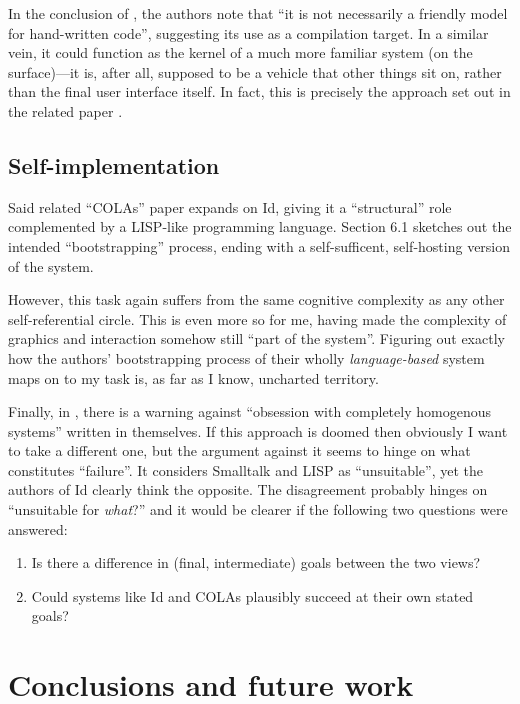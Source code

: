 In the conclusion of \cite{OROM}, the authors note that ``it is not
necessarily a friendly model for hand-written code'', suggesting its use
as a compilation target. In a similar vein, it could function as the
kernel of a much more familiar system (on the surface)---it is, after
all, supposed to be a vehicle that other things sit on, rather than the
final user interface itself. In fact, this is precisely the approach set
out in the related paper \cite{COLAs}.

\hypertarget{self-implementation}{%
\subsection{Self-implementation}\label{self-implementation}}

Said related ``COLAs'' paper expands on Id{}, giving it a ``structural''
role complemented by a LISP-like programming language. Section 6.1
sketches out the intended ``bootstrapping'' process, ending with a
self-sufficent, self-hosting version of the system.

However, this task again suffers from the same cognitive complexity as
any other self-referential circle. This is even more so for me, having
made the complexity of graphics and interaction somehow still ``part of
the system''. Figuring out exactly how the authors' bootstrapping
process of their wholly \emph{language-based} system maps on to my task
is, as far as I know, uncharted territory.

Finally, in \cite{crit-semprola}, there is a warning against ``obsession
with completely homogenous systems'' written in themselves. If this
approach is doomed then obviously I want to take a different one, but
the argument against it seems to hinge on what constitutes ``failure''.
It considers Smalltalk and LISP as ``unsuitable'', yet the authors of
Id{} clearly think the opposite. The disagreement probably hinges on
``unsuitable for \emph{what}?'' and it would be clearer if the following
two questions were answered:

\begin{enumerate}
\def\labelenumi{\arabic{enumi}.}
\tightlist
\item
  Is there a difference in (final, intermediate) goals between the two
  views?
\item
  Could systems like Id{} and COLAs plausibly succeed at their own
  stated goals?
\end{enumerate}

\hypertarget{conclusions-and-future-work}{%
\section{Conclusions and future
work}\label{conclusions-and-future-work}}

